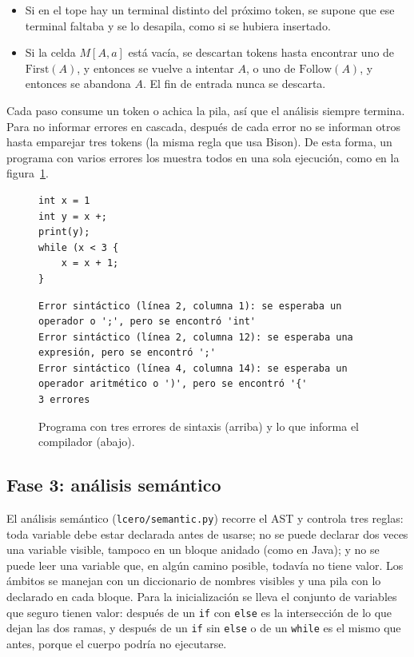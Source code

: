\documentclass[11pt,a4paper]{article}
\theoremstyle{definition}
\newcommand{\tm}[1]{\texttt{#1}}
\newcommand{\First}{\mathrm{First}}
\newcommand{\Follow}{\mathrm{Follow}}
\begin{document}
\begin{itemize}
  \item Si en el tope hay un terminal distinto del próximo token, se supone que
  ese terminal faltaba y se lo desapila, como si se hubiera insertado.
  \item Si la celda $M[A, a]$ está vacía, se descartan tokens hasta encontrar
  uno de $\First(A)$, y entonces se vuelve a intentar $A$, o uno de
  $\Follow(A)$, y entonces se abandona $A$. El fin de entrada nunca se
  descarta.
\end{itemize}

Cada paso consume un token o achica la pila, así que el análisis siempre
termina. Para no informar errores en cascada, después de cada error no se
informan otros hasta emparejar tres tokens (la misma regla que usa Bison).
De esta forma, un programa con varios errores los muestra todos en una sola
ejecución, como en la figura~\ref{fig:errores}.

\begin{figure}[H]
\begin{Verbatim}[breaklines]
int x = 1
int y = x +;
print(y);
while (x < 3 {
    x = x + 1;
}
\end{Verbatim}
\vspace{2pt}
\begin{Verbatim}[breaklines]
Error sintáctico (línea 2, columna 1): se esperaba un operador o ';', pero se encontró 'int'
Error sintáctico (línea 2, columna 12): se esperaba una expresión, pero se encontró ';'
Error sintáctico (línea 4, columna 14): se esperaba un operador aritmético o ')', pero se encontró '{'
3 errores
\end{Verbatim}
\caption{Programa con tres errores de sintaxis (arriba) y lo que informa el compilador (abajo).}
\label{fig:errores}
\end{figure}

\subsection{Fase 3: análisis semántico}
\label{sec:semantico}

El análisis semántico (\tm{lcero/semantic.py}) recorre el AST y controla
tres reglas: toda variable debe estar declarada antes de usarse; no se puede
declarar dos veces una variable visible, tampoco en un bloque anidado (como
en Java); y no se puede leer una variable que, en algún camino posible,
todavía no tiene valor. Los ámbitos se manejan con un diccionario de nombres
visibles y una pila con lo declarado en cada bloque. Para la inicialización
se lleva el conjunto de variables que seguro tienen valor: después de un
\tm{if} con \tm{else} es la intersección de lo que dejan las dos ramas, y
después de un \tm{if} sin \tm{else} o de un \tm{while} es el mismo que
antes, porque el cuerpo podría no ejecutarse.
\end{document}
